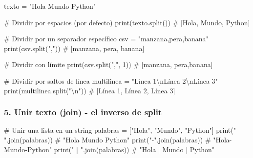 \documentclass[
  doc,
  floatsintext,
  longtable,
  a4paper,
  nolmodern,
  notxfonts,
  notimes,
  12pt,
  colorlinks=true,linkcolor=blue,citecolor=blue,urlcolor=blue]{apa7}
\newenvironment{Shaded}{\begin{snugshade}}{\end{snugshade}}
\newcommand{\BuiltInTok}[1]{\textcolor[rgb]{0.00,0.23,0.31}{#1}}
\newcommand{\CharTok}[1]{\textcolor[rgb]{0.13,0.47,0.30}{#1}}
\newcommand{\CommentTok}[1]{\textcolor[rgb]{0.37,0.37,0.37}{#1}}
\newcommand{\DecValTok}[1]{\textcolor[rgb]{0.68,0.00,0.00}{#1}}
\newcommand{\NormalTok}[1]{\textcolor[rgb]{0.00,0.23,0.31}{#1}}
\newcommand{\OperatorTok}[1]{\textcolor[rgb]{0.37,0.37,0.37}{#1}}
\newcommand{\StringTok}[1]{\textcolor[rgb]{0.13,0.47,0.30}{#1}}
\begin{document}
\begin{Shaded}
\begin{Highlighting}[]
\NormalTok{texto }\OperatorTok{=} \StringTok{"Hola Mundo Python"}

\CommentTok{\# Dividir por espacios (por defecto)}
\BuiltInTok{print}\NormalTok{(texto.split())       }\CommentTok{\# [\textquotesingle{}Hola\textquotesingle{}, \textquotesingle{}Mundo\textquotesingle{}, \textquotesingle{}Python\textquotesingle{}]}

\CommentTok{\# Dividir por un separador específico}
\NormalTok{csv }\OperatorTok{=} \StringTok{"manzana,pera,banana"}
\BuiltInTok{print}\NormalTok{(csv.split(}\StringTok{","}\NormalTok{))      }\CommentTok{\# [\textquotesingle{}manzana\textquotesingle{}, \textquotesingle{}pera\textquotesingle{}, \textquotesingle{}banana\textquotesingle{}]}

\CommentTok{\# Dividir con límite}
\BuiltInTok{print}\NormalTok{(csv.split(}\StringTok{","}\NormalTok{, }\DecValTok{1}\NormalTok{))   }\CommentTok{\# [\textquotesingle{}manzana\textquotesingle{}, \textquotesingle{}pera,banana\textquotesingle{}]}

\CommentTok{\# Dividir por saltos de línea}
\NormalTok{multilinea }\OperatorTok{=} \StringTok{"Línea 1}\CharTok{\textbackslash{}n}\StringTok{Línea 2}\CharTok{\textbackslash{}n}\StringTok{Línea 3"}
\BuiltInTok{print}\NormalTok{(multilinea.split(}\StringTok{"}\CharTok{\textbackslash{}n}\StringTok{"}\NormalTok{))  }\CommentTok{\# [\textquotesingle{}Línea 1\textquotesingle{}, \textquotesingle{}Línea 2\textquotesingle{}, \textquotesingle{}Línea 3\textquotesingle{}]}
\end{Highlighting}
\end{Shaded}

\subsubsection{5. Unir texto (join) - el inverso de
split}\label{unir-texto-join---el-inverso-de-split}

\begin{Shaded}
\begin{Highlighting}[]
\CommentTok{\# Unir una lista en un string}
\NormalTok{palabras }\OperatorTok{=}\NormalTok{ [}\StringTok{"Hola"}\NormalTok{, }\StringTok{"Mundo"}\NormalTok{, }\StringTok{"Python"}\NormalTok{]}
\BuiltInTok{print}\NormalTok{(}\StringTok{" "}\NormalTok{.join(palabras))     }\CommentTok{\# "Hola Mundo Python"}
\BuiltInTok{print}\NormalTok{(}\StringTok{"{-}"}\NormalTok{.join(palabras))     }\CommentTok{\# "Hola{-}Mundo{-}Python"}
\BuiltInTok{print}\NormalTok{(}\StringTok{" | "}\NormalTok{.join(palabras))   }\CommentTok{\# "Hola | Mundo | Python"}
\end{Highlighting}
\end{Shaded}
\end{document}
